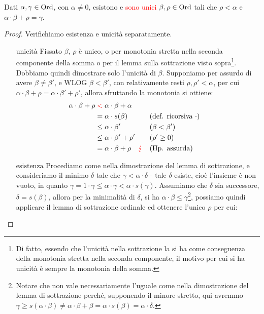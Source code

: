 \pagebreak

\begin{lemma}
	Dati $\alpha,\gamma \in \operatorname{Ord}$, con $\alpha \ne 0$, esistono e \textcolor{red}{sono unici} $\beta, \rho \in \operatorname{Ord}$ tali che $\rho < \alpha$ e $\alpha \cdot \beta + \rho = \gamma$.
\end{lemma}

\begin{proof}
	Verifichiamo esistenza e unicità separatamente.
	\begin{itemize}
		\item[$\boxed{\text{unicità}}$] Fissato $\beta$, $\rho$ è unico, o per monotonia stretta nella seconda componente della somma o per il lemma sulla sottrazione visto sopra\footnote{Di fatto, essendo che l'unicità nella sottrazione la si ha come conseguenza della monotonia stretta nella seconda componente, il motivo per cui si ha unicità è sempre la monotonia della somma.}.
		Dobbiamo quindi dimostrare solo l'unicità di $\beta$. Supponiamo per assurdo di avere $\beta \ne \beta'$, e WLOG $\beta < \beta'$, con relativamente resti $\rho,\rho' < \alpha$, per cui $\alpha \cdot \beta + \rho = \alpha \cdot \beta' + \rho'$, allora sfruttando la monotonia si ottiene:
		\begin{align*}
			\alpha \cdot \beta +\rho  & \;\textcolor{red}{<}\; \alpha \cdot \beta + \alpha \\
									  & = \alpha \cdot s(\beta) &&\text{(def. ricorsiva $\cdot$)} \\
									  & \leq \alpha \cdot \beta' &&(\beta < \beta')\\
									  & \leq \alpha \cdot \beta' + \rho' &&(\rho' \geq 0)\\
									  & = \alpha \cdot \beta + \rho \quad \textcolor{red}{\lightning} &&(\text{Hp. assurda})
		\end{align*}
		\item[$\boxed{\text{esistenza}}$] Procediamo come nella dimostrazione del lemma di sottrazione, e consideriamo il minimo $\delta$ tale che $\gamma < \alpha \cdot \delta$ - tale $\delta$ esiste, cioè l'insieme è non vuoto, in quanto $\gamma = 1 \cdot \gamma \leq \alpha \cdot \gamma < \alpha \cdot s(\gamma)$.
		Assumiamo che $\delta$ sia successore, $\delta = s(\beta)$, allora per la minimalità di $\delta$, si ha $\alpha \cdot \beta \leq \gamma$\footnote{Notare che non vale necessariamente l'uguale come nella dimostrazione del lemma di sottrazione perché, supponendo il minore stretto, qui avremmo
		$\gamma \geq s(\alpha \cdot \beta) \ne \alpha \cdot \beta + \beta =  \alpha \cdot s(\beta) =\alpha \cdot \delta$.}, possiamo quindi applicare il lemma di sottrazione ordinale ed ottenere l'unico $\rho$ per cui:

\end{itemize}
\end{proof}
